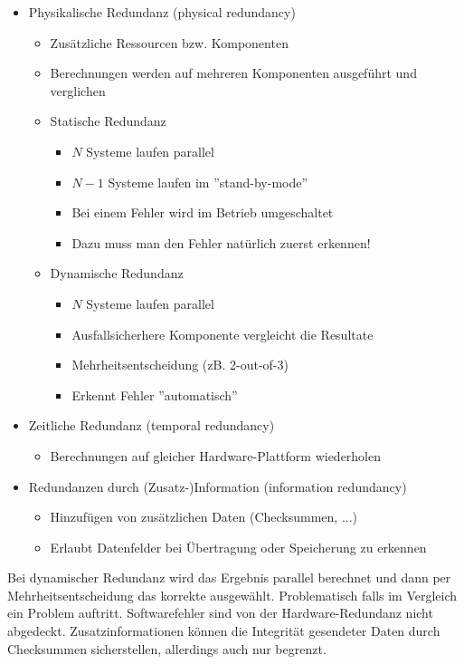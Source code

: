 \documentclass[a4paper,12pt,leqno]{article}
\begin{document}
\begin{itemize}
\item Physikalische Redundanz (physical redundancy)
	\begin{itemize}
	\item Zusätzliche Ressourcen bzw. Komponenten
	\item Berechnungen werden auf mehreren Komponenten ausgeführt und verglichen
	\item Statische Redundanz
		\begin{itemize}
		\item $N$ Systeme laufen parallel
		\item $N-1$ Systeme laufen im  ''stand-by-mode''
		\item Bei einem Fehler wird im Betrieb umgeschaltet
		\item Dazu muss man den Fehler natürlich zuerst erkennen!
		\end{itemize}
	\item Dynamische Redundanz
		\begin{itemize}
		\item $N$ Systeme laufen parallel
		\item Ausfallsicherhere Komponente vergleicht die Resultate
		\item Mehrheitsentscheidung (zB. 2-out-of-3)
		\item Erkennt Fehler ''automatisch''
		\end{itemize}
	\end{itemize}
\item Zeitliche Redundanz (temporal redundancy)
	\begin{itemize}
	\item Berechnungen auf gleicher Hardware-Plattform wiederholen
	\end{itemize}
\item Redundanzen durch (Zusatz-)Information (information redundancy)
	\begin{itemize}
	\item Hinzufügen von zusätzlichen Daten (Checksummen, ...)
	\item Erlaubt Datenfelder bei Übertragung oder Speicherung zu erkennen
	\end{itemize}
\end{itemize}
Bei dynamischer Redundanz wird das Ergebnis parallel berechnet und dann per Mehrheitsentscheidung das korrekte ausgewählt. Problematisch falls im Vergleich ein Problem auftritt. Softwarefehler sind von der Hardware-Redundanz nicht abgedeckt.
Zusatzinformationen können die Integrität gesendeter Daten durch Checksummen sicherstellen, allerdings auch nur begrenzt.\\
\end{document}
